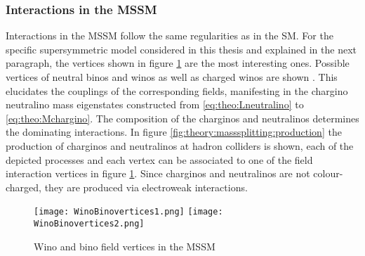 \subsubsection{Interactions in the MSSM}
Interactions in the MSSM follow the same regularities as in the SM. For the specific supersymmetric model considered in this thesis and explained in the next paragraph, the vertices shown in figure \ref{fig:theory:winobinovertices} are the most interesting ones. Possible vertices of neutral binos and winos as well as charged winos are shown \cite{Catena2014}. This elucidates the couplings of the corresponding fields, manifesting in the chargino neutralino mass eigenstates constructed from \eqref{eq:theo:Lneutralino} to \eqref{eq:theo:Mchargino}. The composition of the charginos and neutralinos determines the dominating interactions. In figure \ref{fig:theory:masssplitting:production} the production of charginos and neutralinos at hadron colliders is shown, each of the depicted processes and each vertex can be associated to one of the field interaction vertices in figure \ref{fig:theory:winobinovertices}. Since charginos and neutralinos are not colour-charged, they are produced via electroweak interactions. 


\begin{figure}[h]
	\centering
	\texttt{[image: WinoBinovertices1.png]}
	\texttt{[image: WinoBinovertices2.png]}
	\caption{Wino and bino field vertices in the MSSM \cite{Catena2014} \label{fig:theory:winobinovertices}}
\end{figure}





